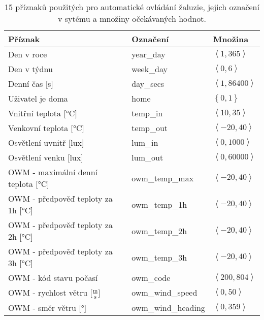 \begin{table}[htbp]
  \centering
    \begin{tabular}{l|l|l}
    Příznak & Označení & Množina \\
    \midrule
    \midrule
    Den v roce & year\_day & $\left\langle 1, 365\right\rangle $ \\
    \midrule
    Den v týdnu & week\_day & $\left\langle 0, 6\right\rangle $ \\
    \midrule
    Denní čas [s] & day\_secs & $\left\langle 1, 86400\right\rangle $ \\
    \midrule
    Uživatel je doma & home  & $\left\{  0,1\right\}  $ \\
    \midrule
    Vnitřní teplota  [°C]& temp\_in & $\left\langle 10, 35\right\rangle $ \\
    \midrule
    Venkovní teplota  [°C]& temp\_out & $\left\langle -20, 40\right\rangle $ \\
    \midrule
    Osvětlení uvnitř [lux]& lum\_in & $\left\langle 0, 1000\right\rangle $ \\
    \midrule
    Osvětlení venku [lux]& lum\_out & $\left\langle 0, 60000\right\rangle $ \\
    \midrule
    OWM - maximální denní teplota  [°C]& owm\_temp\_max & $\left\langle -20, 40\right\rangle $ \\
    \midrule
    OWM - předpověď teploty za 1h  [°C]& owm\_temp\_1h & $\left\langle -20, 40\right\rangle $ \\
    \midrule
    OWM -  předpověď teploty za 2h  [°C]& owm\_temp\_2h & $\left\langle -20, 40\right\rangle $ \\
    \midrule
    OWM -  předpověď teploty za 3h [°C] & owm\_temp\_3h & $\left\langle -20, 40\right\rangle $ \\
    \midrule
    OWM - kód stavu počasí & owm\_code & $\left\langle 200, 804\right\rangle $ \\
    \midrule
    OWM - rychlost větru  [$\frac{\mathrm{m}}{\mathrm{s}}$]& owm\_wind\_speed & $\left\langle 0, 50\right\rangle $ \\
    \midrule
    OWM - směr větru [°]& owm\_wind\_heading & $\left\langle 0, 359\right\rangle $ \\
    \bottomrule
    \bottomrule
    \end{tabular}%
    \caption[Příznaky pro automatické ovládání žaluzie]{15 příznaků použitých pro automatické ovládání žaluzie, jejich označení v sytému a množiny očekávaných hodnot.}
  \label{tab:features}%
\end{table}%
